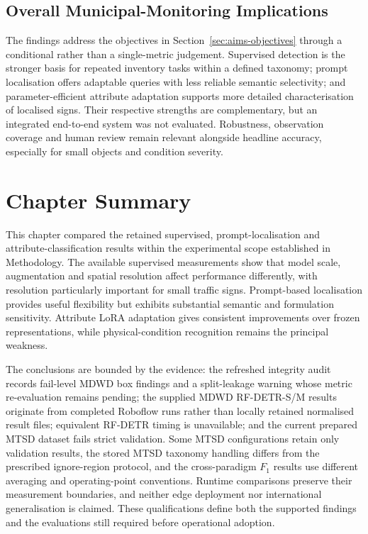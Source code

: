 \subsection{Overall Municipal-Monitoring Implications}
The findings address the objectives in Section~\ref{sec:aims-objectives} through a conditional rather than a single-metric judgement. Supervised detection is the stronger basis for repeated inventory tasks within a defined taxonomy; prompt localisation offers adaptable queries with less reliable semantic selectivity; and parameter-efficient attribute adaptation supports more detailed characterisation of localised signs. Their respective strengths are complementary, but an integrated end-to-end system was not evaluated. Robustness, observation coverage and human review remain relevant alongside headline accuracy, especially for small objects and condition severity.

\section{Chapter Summary}
\label{sec:ev-summary}
This chapter compared the retained supervised, prompt-localisation and attribute-classification results within the experimental scope established in Methodology. The available supervised measurements show that model scale, augmentation and spatial resolution affect performance differently, with resolution particularly important for small traffic signs. Prompt-based localisation provides useful flexibility but exhibits substantial semantic and formulation sensitivity. Attribute \gls{LoRA} adaptation gives consistent improvements over frozen representations, while physical-condition recognition remains the principal weakness.

The conclusions are bounded by the evidence: the refreshed integrity audit records fail-level MDWD box findings and a split-leakage warning whose metric re-evaluation remains pending; the supplied MDWD RF-DETR-S/M results originate from completed Roboflow runs rather than locally retained normalised result files; equivalent RF-DETR timing is unavailable; and the current prepared MTSD dataset fails strict validation. Some MTSD configurations retain only validation results, the stored MTSD taxonomy handling differs from the prescribed ignore-region protocol, and the cross-paradigm \(F_1\) results use different averaging and operating-point conventions. Runtime comparisons preserve their measurement boundaries, and neither edge deployment nor international generalisation is claimed. These qualifications define both the supported findings and the evaluations still required before operational adoption.
